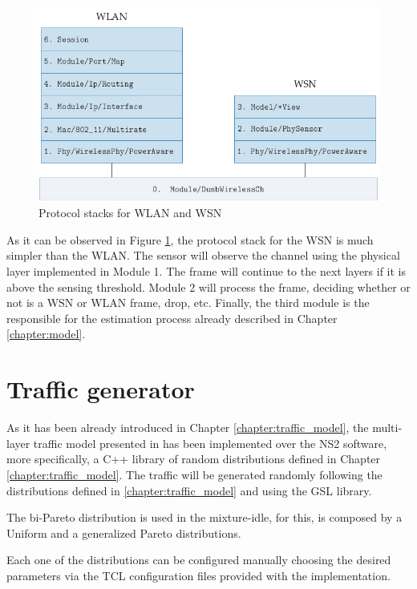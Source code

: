 \begin{figure}[h]
	\centering
	\includegraphics[scale=0.5]{images/simulation/protocol_stack}
	\caption{Protocol stacks for \acs{WLAN} and \acs{WSN} \cite{marcello-thesis}}
	\label{fig:protocol_stack}
\end{figure}

As it can be observed in Figure \ref{fig:protocol_stack}, the protocol stack for the \acs{WSN} is much simpler than the \acs{WLAN}. The sensor will observe the channel using the physical layer implemented in Module 1. The frame will continue to the next layers if it is above the sensing threshold. Module 2 will process the frame, deciding whether or not is a \acs{WSN} or \acs{WLAN} frame, drop, etc. Finally, the third module is the responsible for the estimation process already described in Chapter \ref{chapter:model}.

\section{Traffic generator} \label{sec:traffic_simulation}
As it has been already introduced in Chapter \ref{chapter:traffic_model}, the multi-layer traffic model presented in \cite{Campus-WLAN} has been implemented over the NS2 software, more specifically, a C++ library of random distributions defined in Chapter \ref{chapter:traffic_model}. The traffic will be generated randomly following the distributions defined in \ref{chapter:traffic_model} and using the \acs{GSL} library.

The bi-Pareto distribution is used in the mixture-idle, for this, is composed by a Uniform and a generalized Pareto distributions.

Each one of the distributions can be configured manually choosing the desired parameters via the TCL configuration files provided with the implementation.


